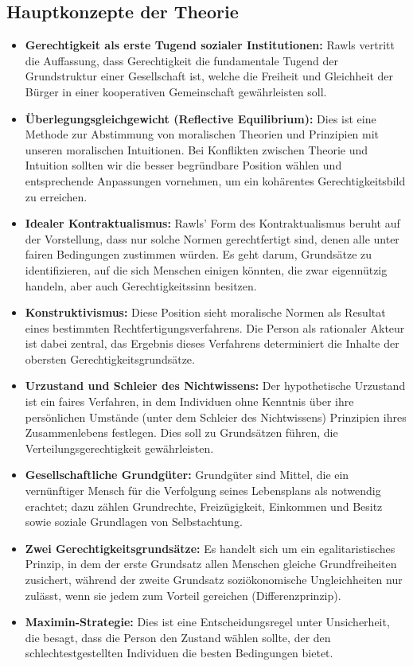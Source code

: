 \documentclass{article}
\begin{document}
\subsection{Hauptkonzepte der Theorie}

\begin{itemize}
	\item \textbf{Gerechtigkeit als erste Tugend sozialer Institutionen:} Rawls vertritt die Auffassung, dass Gerechtigkeit die fundamentale Tugend der Grundstruktur einer Gesellschaft ist, welche die Freiheit und Gleichheit der Bürger in einer kooperativen Gemeinschaft gewährleisten soll.
	\item \textbf{Überlegungsgleichgewicht (Reflective Equilibrium):} Dies ist eine Methode zur Abstimmung von moralischen Theorien und Prinzipien mit unseren moralischen Intuitionen. Bei Konflikten zwischen Theorie und Intuition sollten wir die besser begründbare Position wählen und entsprechende Anpassungen vornehmen, um ein kohärentes Gerechtigkeitsbild zu erreichen.
	\item \textbf{Idealer Kontraktualismus:} Rawls' Form des Kontraktualismus beruht auf der Vorstellung, dass nur solche Normen gerechtfertigt sind, denen alle unter fairen Bedingungen zustimmen würden. Es geht darum, Grundsätze zu identifizieren, auf die sich Menschen einigen könnten, die zwar eigennützig handeln, aber auch Gerechtigkeitssinn besitzen.
	\item \textbf{Konstruktivismus:} Diese Position sieht moralische Normen als Resultat eines bestimmten Rechtfertigungsverfahrens. Die Person als rationaler Akteur ist dabei zentral, das Ergebnis dieses Verfahrens determiniert die Inhalte der obersten Gerechtigkeitsgrundsätze.
	\item \textbf{Urzustand und Schleier des Nichtwissens:} Der hypothetische Urzustand ist ein faires Verfahren, in dem Individuen ohne Kenntnis über ihre persönlichen Umstände (unter dem Schleier des Nichtwissens) Prinzipien ihres Zusammenlebens festlegen. Dies soll zu Grundsätzen führen, die Verteilungsgerechtigkeit gewährleisten.
	\item \textbf{Gesellschaftliche Grundgüter:} Grundgüter sind Mittel, die ein vernünftiger Mensch für die Verfolgung seines Lebensplans als notwendig erachtet; dazu zählen Grundrechte, Freizügigkeit, Einkommen und Besitz sowie soziale Grundlagen von Selbstachtung.
	\item \textbf{Zwei Gerechtigkeitsgrundsätze:} Es handelt sich um ein egalitaristisches Prinzip, in dem der erste Grundsatz allen Menschen gleiche Grundfreiheiten zusichert, während der zweite Grundsatz soziökonomische Ungleichheiten nur zulässt, wenn sie jedem zum Vorteil gereichen (Differenzprinzip).
	\item \textbf{Maximin-Strategie:} Dies ist eine Entscheidungsregel unter Unsicherheit, die besagt, dass die Person den Zustand wählen sollte, der den schlechtestgestellten Individuen die besten Bedingungen bietet.
\end{itemize}
\end{document}
